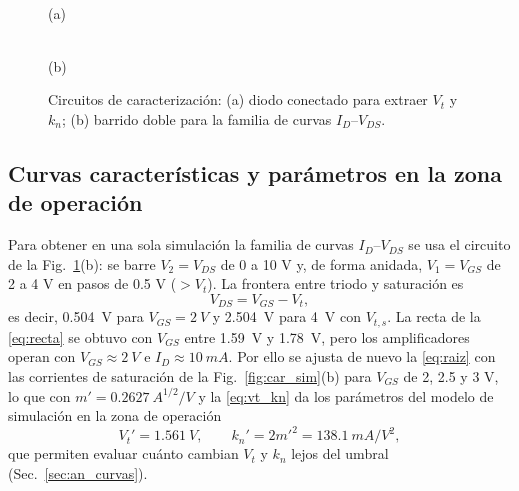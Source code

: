 \documentclass[conference]{IEEEtran}
\newcommand{\kn}{k_n}
\newcommand{\Vtp}{V_t'}
\newcommand{\knp}{k_n'}
\newcommand{\Vts}{V_{t,s}}
\begin{document}
\begin{figure}[htbp]
\centering
\begin{minipage}[b]{0.44\columnwidth}
\centering
{}\\[2pt]
{\footnotesize (a)}
\end{minipage}\hfill
\begin{minipage}[b]{0.44\columnwidth}
\centering
{}\\[2pt]
{\footnotesize (b)}
\end{minipage}
\caption{Circuitos de caracterización: (a) diodo conectado para extraer $V_t$ y $\kn$; (b) barrido doble para la familia de curvas $I_D$--$V_{DS}$.}
\label{fig:circ_car}
\end{figure}

\subsection{Curvas características y parámetros en la zona de operación}
Para obtener en una sola simulación la familia de curvas $I_D$--$V_{DS}$ se usa el circuito de la Fig.~\ref{fig:circ_car}(b): se barre $V_2=V_{DS}$ de 0 a 10 V y, de forma anidada, $V_1=V_{GS}$ de 2 a 4 V en pasos de 0.5 V ($>V_t$). La frontera entre triodo y saturación es
\begin{equation}
V_{DS}=V_{GS}-V_t,
\label{eq:frontera}
\end{equation}
es decir, \SI{0.504}{V} para $V_{GS}=\SI{2}{V}$ y \SI{2.504}{V} para \SI{4}{V} con $\Vts$. La recta de la \eqref{eq:recta} se obtuvo con $V_{GS}$ entre \SI{1.59}{V} y \SI{1.78}{V}, pero los amplificadores operan con $V_{GS}\approx\SI{2}{V}$ e $I_D\approx\SI{10}{mA}$. Por ello se ajusta de nuevo la \eqref{eq:raiz} con las corrientes de saturación de la Fig.~\ref{fig:car_sim}(b) para $V_{GS}$ de 2, 2.5 y 3 V, lo que con $m'=\SI{0.2627}{A^{1/2}/V}$ y la \eqref{eq:vt_kn} da los parámetros del modelo de simulación en la zona de operación
\begin{equation}
\Vtp=\SI{1.561}{V},\qquad \knp=2m'^2=\SI{138.1}{mA/V^2},
\label{eq:param_op}
\end{equation}
que permiten evaluar cuánto cambian $V_t$ y $\kn$ lejos del umbral (Sec.~\ref{sec:an_curvas}).
\end{document}
